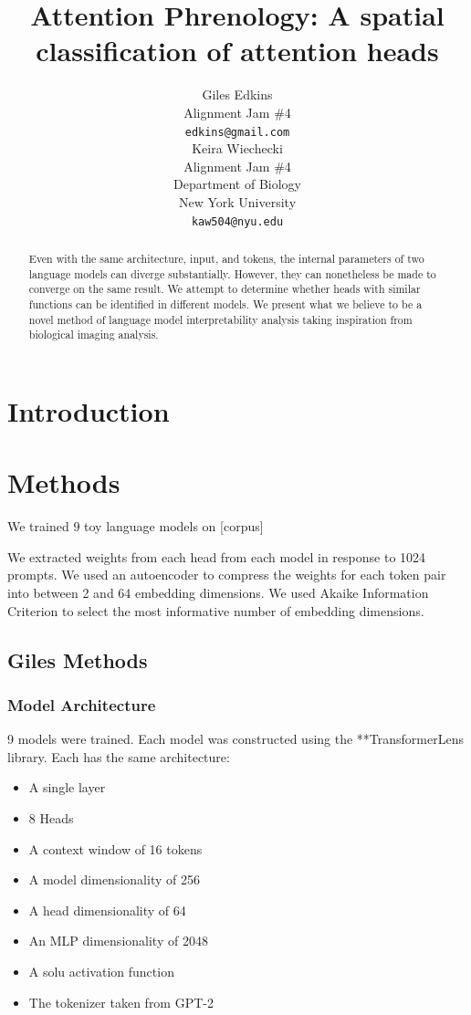 \documentclass{article}
\title{Attention Phrenology: A spatial classification of attention heads}
\author{
 Giles Edkins \\
  Alignment Jam \#4 \\
  \texttt{edkins@gmail.com} \\
   \And
 Keira Wiechecki \\
  Alignment Jam \#4 \\
  Department of Biology \\
  New York University \\
  \texttt{kaw504@nyu.edu} \\
}
\begin{document}
\maketitle
\begin{abstract}
Even with the same architecture, input, and tokens, the internal parameters of two language models can diverge substantially. However, they can nonetheless be made to converge on the same result. We attempt to determine whether heads with similar functions can be identified in different models. We present what we believe to be a novel method of language model interpretability analysis taking inspiration from biological imaging analysis.

\end{abstract}




\section{Introduction}


\section{Methods}
We trained 9 toy language models on [corpus]

We extracted weights from each head from each model in response to 1024 prompts. We used an autoencoder to compress the weights for each token pair into between 2 and 64 embedding dimensions. We used Akaike Information Criterion to select the most informative number of embedding dimensions.

\subsection{Giles Methods}
\subsubsection{Model Architecture}

9 models were trained. Each model was constructed using the **TransformerLens library. Each has the same architecture:
\begin{itemize}
	\item A single layer
	\item 8 Heads
	\item A context window of 16 tokens
	\item A model dimensionality of 256
	\item A head dimensionality of 64
	\item An MLP dimensionality of 2048
	\item A solu activation function
	\item The tokenizer taken from GPT-2
\end{itemize}
\end{document}
